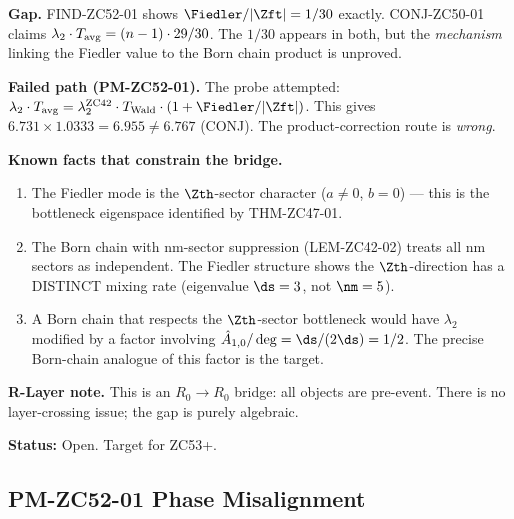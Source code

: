 \documentclass[12pt, a4paper]{article}
\begin{document}
\begin{openqbox}[title={GAP-ZC52-01: Bridge from Fiedler$=1/2$
  to CONJ-ZC50-01 (Open, $R_0\to R_0$)}]
\textbf{Gap.}
FIND-ZC52-01 shows $\Fiedler/|\Zft| = 1/30$ exactly.
CONJ-ZC50-01 claims $\lambda_2\cdot T_{\rm avg} = (n-1)\cdot 29/30$.
The $1/30$ appears in both, but the \emph{mechanism} linking
the Fiedler value to the Born chain product is unproved.

\textbf{Failed path (PM-ZC52-01).}
The probe attempted: $\lambda_2\cdot T_{\rm avg}
= \lambda_2^{\rm ZC42}\cdot T_{\rm Wald}\cdot(1 + \Fiedler/|\Zft|)$.
This gives $6.731\times 1.0333 = 6.955\neq 6.767$ (CONJ).
The product-correction route is \emph{wrong}.

\textbf{Known facts that constrain the bridge.}
\begin{enumerate}[leftmargin=2em]
\item The Fiedler mode is the $\Zth$-sector character
  ($a\neq0$, $b=0$) — this is the bottleneck eigenspace
  identified by THM-ZC47-01.
\item The Born chain with nm-sector suppression (LEM-ZC42-02)
  treats all nm sectors as independent. The Fiedler structure
  shows the $\Zth$-direction has a DISTINCT mixing rate
  (eigenvalue $\ds=3$, not $\nm=5$).
\item A Born chain that respects the $\Zth$-sector bottleneck
  would have $\lambda_2$ modified by a factor involving
  $\hat{A}_{1,0}/\deg = \ds/(2\ds) = 1/2$. The precise
  Born-chain analogue of this factor is the target.
\end{enumerate}

\textbf{R-Layer note.}
This is an $R_0\to R_0$ bridge: all objects are pre-event.
There is no layer-crossing issue; the gap is purely algebraic.

\textbf{Status:} Open. Target for ZC53+.
\end{openqbox}

\subsection{PM-ZC52-01 \quad Phase Misalignment}
\end{document}
